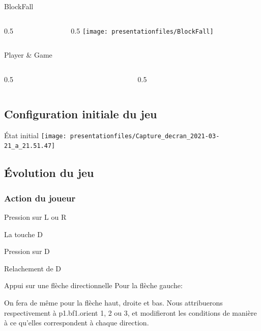 \documentclass[10pt,dvipsnames,final]{beamer}
\newcommand{\midcolumn}[2]{
\begin{columns}
	\begin{column}{0.5\textwidth}
		#1
	\end{column}
	\begin{column}{0.5\textwidth}
		#2
	\end{column}
\end{columns}
}
\begin{document}
\begin{frame}{BlockFall}
\midcolumn{}{\texttt{[image: presentationfiles/BlockFall]}}
\end{frame}

\begin{frame}{Player \& Game}
\midcolumn{}{}
\end{frame}

\subsection{Configuration initiale du jeu}

\begin{frame}{État initial}
\texttt{[image: presentationfiles/Capture\_decran\_2021-03-21\_a\_21.51.47]} 
\end{frame}

\subsection{Évolution du jeu}

\subsubsection{Action du joueur}

\begin{frame}{Pression sur L ou R}

\end{frame}

\begin{frame}{La touche D}
\begin{block}{Pression sur D}

\end{block}
\begin{block}{Relachement de D}

\end{block}
\end{frame}

\begin{frame}{Appui sur une flèche directionnelle}
Pour la flèche gauche:

On fera de même pour la flèche haut, droite et bas. Nous attribuerons respectivement à p1.bf1.orient 1, 2 ou 3, et modifieront les conditions de manière à ce qu'elles correspondent à chaque direction.
\end{frame}
\end{document}
